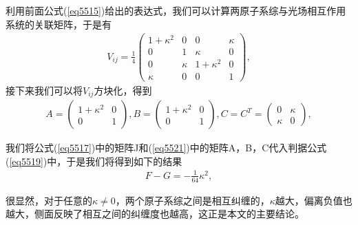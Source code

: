 利用前面公式(\ref{eq5515})给出的表达式，我们可以计算两原子系综与光场相互作用系统的关联矩阵，于是有
\begin{align}\label{eq5520}
	{V_{ij}} =\frac14 \left( 
	{
		\begin{array}{*{20}{c}}
			1+\kappa^2 &    0   &    0       & \kappa \\
			0      &    1   & \kappa     &    0   \\
			0      & \kappa & 1+\kappa^2 &    0   \\
			\kappa   &    0   &    0       &    1
		\end{array}
	} 
	\right),
\end{align}
接下来我们可以将$V_{ij}$方块化，得到
\begin{align}\label{eq5521}
	A=\left(
	{
		\begin{array}{*{20}{cc}}
			1+\kappa^2  & 0\\
			0        & 1
		\end{array}
	} 
	\right),
	B=\left(
	{
		\begin{array}{*{20}{cc}}
			1+\kappa^2  & 0\\
			0        & 1
		\end{array}
	} 
	\right),
	C=C^T=\left(
	{
		\begin{array}{*{20}{cc}}
			0       & \kappa\\
			\kappa     &   0 
		\end{array}
	} 
	\right),
\end{align}

我们将公式(\ref{eq5517})中的矩阵J和(\ref{eq5521})中的矩阵A，B，C代入判据公式(\ref{eq5519})中，于是我们将得到如下的结果
\begin{align}\label{eq5522}
	F-G=-\frac1{64}\kappa^2,
\end{align}

很显然，对于任意的$\kappa\ne 0$，两个原子系综之间是相互纠缠的，$\kappa$越大，偏离负值也越大，侧面反映了相互之间的纠缠度也越高，这正是本文的主要结论。

\vbox{}
